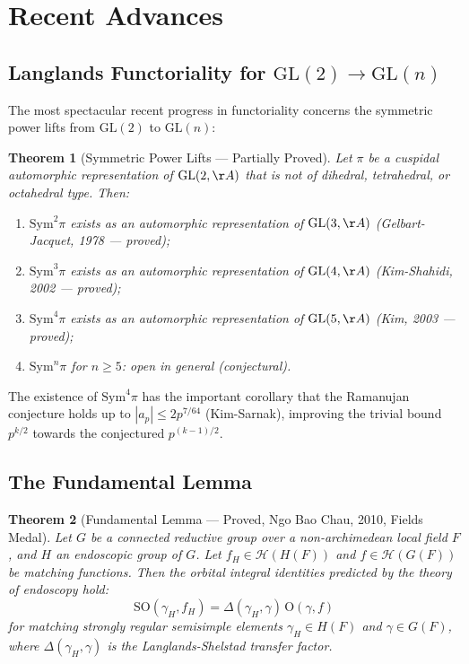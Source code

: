 \documentclass[12pt,a4paper]{amsart}
\newtheorem{theorem}{Theorem}[section]
\theoremstyle{definition}
\newcommand{\GL}{\mathrm{GL}}
\begin{document}
\section{Recent Advances}
\label{sec:recent}

\subsection{Langlands Functoriality for \texorpdfstring{$\GL(2) \to \GL(n)$}{GL(2) to GL(n)}}

The most spectacular recent progress in functoriality concerns the symmetric power
lifts from $\GL(2)$ to $\GL(n)$:

\begin{theorem}[Symmetric Power Lifts — Partially Proved]
\label{thm:sym_power}
Let $\pi$ be a cuspidal automorphic representation of $\GL(2,\AA)$ that is not
of dihedral, tetrahedral, or octahedral type. Then:
\begin{enumerate}[label=(\roman*)]
\item $\mathrm{Sym}^2 \pi$ exists as an automorphic representation of $\GL(3,\AA)$
  (Gelbart-Jacquet, 1978 — proved);
\item $\mathrm{Sym}^3 \pi$ exists as an automorphic representation of $\GL(4,\AA)$
  (Kim-Shahidi, 2002 — proved);
\item $\mathrm{Sym}^4 \pi$ exists as an automorphic representation of $\GL(5,\AA)$
  (Kim, 2003 — proved);
\item $\mathrm{Sym}^n \pi$ for $n \geq 5$: open in general (conjectural).
\end{enumerate}
\end{theorem}

The existence of $\mathrm{Sym}^4 \pi$ has the important corollary that the
Ramanujan conjecture holds up to $|a_p| \leq 2p^{7/64}$ (Kim-Sarnak), improving
the trivial bound $p^{k/2}$ towards the conjectured $p^{(k-1)/2}$.

\subsection{The Fundamental Lemma}

\begin{theorem}[Fundamental Lemma — Proved, Ngo Bao Chau, 2010, Fields Medal]
\label{thm:fundamental_lemma}
Let $G$ be a connected reductive group over a non-archimedean local field $F$,
and $H$ an endoscopic group of $G$. Let $f_H \in \mathcal{H}(H(F))$ and
$f \in \mathcal{H}(G(F))$ be matching functions. Then the orbital integral
identities predicted by the theory of endoscopy hold:
\[
\text{SO}(\gamma_H, f_H) = \Delta(\gamma_H, \gamma)\, \text{O}(\gamma, f)
\]
for matching strongly regular semisimple elements $\gamma_H \in H(F)$ and
$\gamma \in G(F)$, where $\Delta(\gamma_H,\gamma)$ is the Langlands-Shelstad
transfer factor.
\end{theorem}
\end{document}
